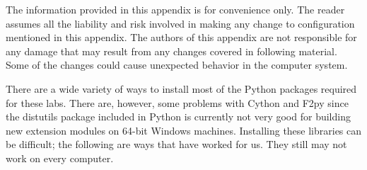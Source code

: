 \label{win64install}


\begin{warn}
The information provided in this appendix is for convenience only.
The reader assumes all the liability and risk involved in making any change to configuration mentioned in this appendix.
The authors of this appendix are not responsible for any damage that may result from any changes covered in following material.
Some of the changes could cause unexpected behavior in the computer system.
\end{warn}

There are a wide variety of ways to install most of the Python packages required for these labs.
There are, however, some problems with Cython and F2py since the distutils package included in Python is currently not very good for building new extension modules on 64-bit Windows machines.
Installing these libraries can be difficult; the following are ways that have worked for us.
They still may not work on every computer.

